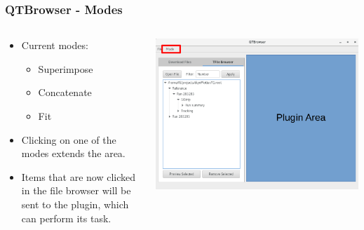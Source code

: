 \documentclass{beamer}
\begin{document}
\begin{frame}
\frametitle{QTBrowser - Modes}
  \begin{columns}[T]
    \begin{column}{.5\textwidth}
     \begin{block}{}
     \begin{itemize}
          \item Current modes:
     	\begin{itemize}
     		\item Superimpose
     		\item Concatenate
     		\item Fit
		\end{itemize}   
     \item Clicking on one of the modes extends the area.
     \item Items that are now clicked in the file browser will be sent to the plugin, which can perform its task.
  	 
     \end{itemize}

    	\end{block}	
    \end{column}
    \begin{column}{.5\textwidth}
    \begin{block}{}
    \includegraphics[width=\textwidth]{figures/plugin_area.png}
    \end{block}
    \end{column}
  \end{columns}
\end{frame}
\end{document}
